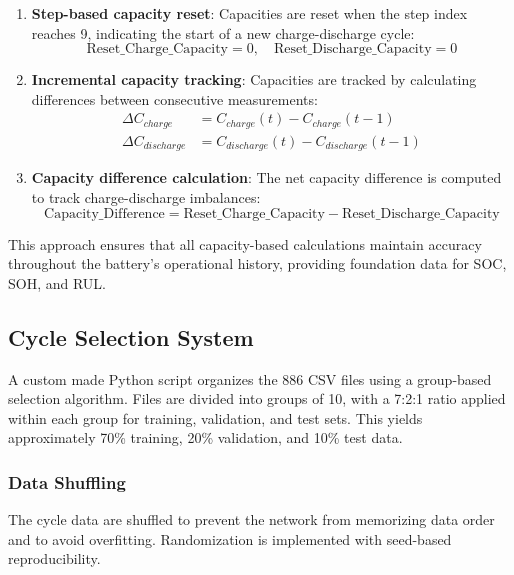 \begin{enumerate}
    \item \textbf{Step-based capacity reset}: Capacities are reset when the step index reaches 9, indicating the start of a new charge-discharge cycle:
    \begin{equation}
        \text{Reset\_Charge\_Capacity} = 0, \quad \text{Reset\_Discharge\_Capacity} = 0
    \end{equation}
    
    \item \textbf{Incremental capacity tracking}: Capacities are tracked by calculating differences between consecutive measurements:
    \begin{align}
        \Delta C_{charge} &= C_{charge}(t) - C_{charge}(t-1) \\
        \Delta C_{discharge} &= C_{discharge}(t) - C_{discharge}(t-1)
    \end{align}
    
    \item \textbf{Capacity difference calculation}: The net capacity difference is computed to track charge-discharge imbalances:
    \begin{equation}
        \text{Capacity\_Difference} = \text{Reset\_Charge\_Capacity} - \text{Reset\_Discharge\_Capacity}
    \end{equation}
\end{enumerate}

This approach ensures that all capacity-based calculations maintain accuracy throughout the battery's operational history, providing foundation data for SOC, SOH, and RUL.
\subsection{Cycle Selection System}
\label{subsec:cycle_selection_system}

A custom made Python script organizes the 886 CSV files using a group-based selection algorithm. Files are divided into groups of 10, with a 7:2:1 ratio applied within each group for training, validation, and test sets. This yields approximately 70\% training, 20\% validation, and 10\% test data.

\subsubsection{Data Shuffling}

The cycle data are shuffled to prevent the network from memorizing data order and to avoid overfitting. Randomization is implemented with seed-based reproducibility.

